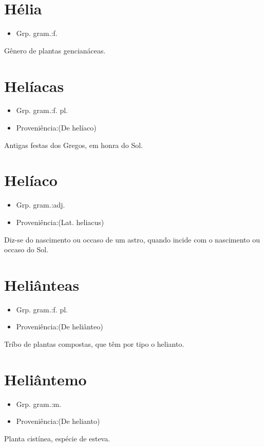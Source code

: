 \documentclass{article}
\begin{document}
\section{Hélia}
\begin{itemize}
\item {Grp. gram.:f.}
\end{itemize}
Gênero de plantas gencianáceas.
\section{Helíacas}
\begin{itemize}
\item {Grp. gram.:f. pl.}
\end{itemize}
\begin{itemize}
\item {Proveniência:(De \textunderscore helíaco\textunderscore )}
\end{itemize}
Antigas festas dos Gregos, em honra do Sol.
\section{Helíaco}
\begin{itemize}
\item {Grp. gram.:adj.}
\end{itemize}
\begin{itemize}
\item {Proveniência:(Lat. \textunderscore heliacus\textunderscore )}
\end{itemize}
Diz-se do nascimento ou occaso de um astro, quando incide com o nascimento ou occaso do Sol.
\section{Heliânteas}
\begin{itemize}
\item {Grp. gram.:f. pl.}
\end{itemize}
\begin{itemize}
\item {Proveniência:(De \textunderscore heliânteo\textunderscore )}
\end{itemize}
Tríbo de plantas compostas, que têm por tipo o helianto.
\section{Heliântemo}
\begin{itemize}
\item {Grp. gram.:m.}
\end{itemize}
\begin{itemize}
\item {Proveniência:(De \textunderscore helianto\textunderscore )}
\end{itemize}
Planta cistínea, espécie de esteva.
\end{document}
